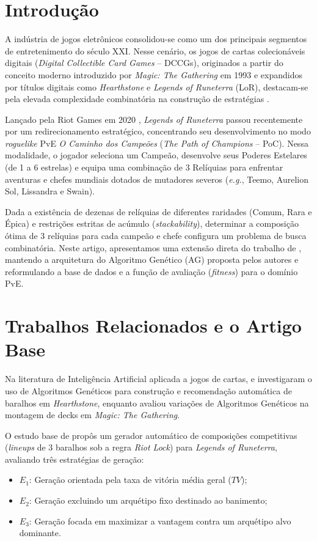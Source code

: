 \documentclass[12pt]{article}
\begin{document}
\section{Introdução}

A indústria de jogos eletrônicos consolidou-se como um dos principais segmentos de entretenimento do século XXI. Nesse cenário, os jogos de cartas colecionáveis digitais (\textit{Digital Collectible Card Games} -- DCCGs), originados a partir do conceito moderno introduzido por \textit{Magic: The Gathering} em 1993 e expandidos por títulos digitais como \textit{Hearthstone} e \textit{Legends of Runeterra} (LoR), destacam-se pela elevada complexidade combinatória na construção de estratégias \cite{balbinot2024}.

Lançado pela Riot Games em 2020 \cite{riot2024}, \textit{Legends of Runeterra} passou recentemente por um redirecionamento estratégico, concentrando seu desenvolvimento no modo \textit{roguelike} PvE \textit{O Caminho dos Campeões} (\textit{The Path of Champions} -- PoC). Nessa modalidade, o jogador seleciona um Campeão, desenvolve seus Poderes Estelares (de 1 a 6 estrelas) e equipa uma combinação de 3 Relíquias para enfrentar aventuras e chefes mundiais dotados de mutadores severos (\textit{e.g.}, Teemo, Aurelion Sol, Lissandra e Swain).

Dada a existência de dezenas de relíquias de diferentes raridades (Comum, Rara e Épica) e restrições estritas de acúmulo (\textit{stackability}), determinar a composição ótima de 3 relíquias para cada campeão e chefe configura um problema de busca combinatória. Neste artigo, apresentamos uma extensão direta do trabalho de \cite{balbinot2024}, mantendo a arquitetura do Algoritmo Genético (AG) proposta pelos autores e reformulando a base de dados e a função de avaliação (\textit{fitness}) para o domínio PvE.

\section{Trabalhos Relacionados e o Artigo Base}

Na literatura de Inteligência Artificial aplicada a jogos de cartas, \cite{garcia2016} e \cite{chen2018} investigaram o uso de Algoritmos Genéticos para construção e recomendação automática de baralhos em \textit{Hearthstone}, enquanto \cite{yang2021} avaliou variações de Algoritmos Genéticos na montagem de decks em \textit{Magic: The Gathering}.

O estudo base de \cite{balbinot2024} propôs um gerador automático de composições competitivas (\textit{lineups} de 3 baralhos sob a regra \textit{Riot Lock}) para \textit{Legends of Runeterra}, avaliando três estratégias de geração:
\begin{itemize}
    \item $E_1$: Geração orientada pela taxa de vitória média geral ($TV$);
    \item $E_2$: Geração excluindo um arquétipo fixo destinado ao banimento;
    \item $E_3$: Geração focada em maximizar a vantagem contra um arquétipo alvo dominante.
\end{itemize}
\end{document}
